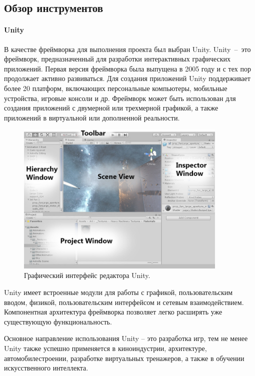 ﻿\subsection{Обзор инструментов}
\label{subsections:Tools}

\paragraph{Unity}

В качестве фреймворка для выполнения проекта был выбран Unity.
Unity~--~это фреймворк, предназначенный для разработки интерактивных графических приложений.%
\cite{DocUnity}
Первая версия фреймворка была выпущена в 2005 году
и с тех пор продолжает активно развиваться.
Для создания приложений Unity поддерживает более 20 платформ,
включающих персональные компьютеры, мобильные устройства, игровые консоли и др.
Фреймворк может быть использован для создания приложений
с двумерной или трехмерной графикой, а также приложений
в виртуальной или дополненной реальности.

\begin{figure}[ht]
    \centering
    \includegraphics[width=0.9\textwidth, frame]{images/Unity-interface.jpg}
    \caption{Графический интерфейс редактора Unity.%
    \cite{DocUnity}}
    \label{figure:UnityInterface}
\end{figure}

Unity имеет встроенные модули для работы с
графикой, пользовательским вводом, физикой,
пользовательским интерфейсом и сетевым взаимодействием.
Компонентная архитектура фреймворка позволяет
легко расширять уже существующую функциональность.

Основное направление использования Unity -- это разработка игр,
тем не менее Unity также успешно применяется в киноиндустрии,\cite{UnityInFilmmaking}
архитектуре, автомобилестроении,\cite{UnityInAutomotive}
разработке виртуальных тренажеров, а также в
обучении искусственного интеллекта.\cite{UnityInAI}

